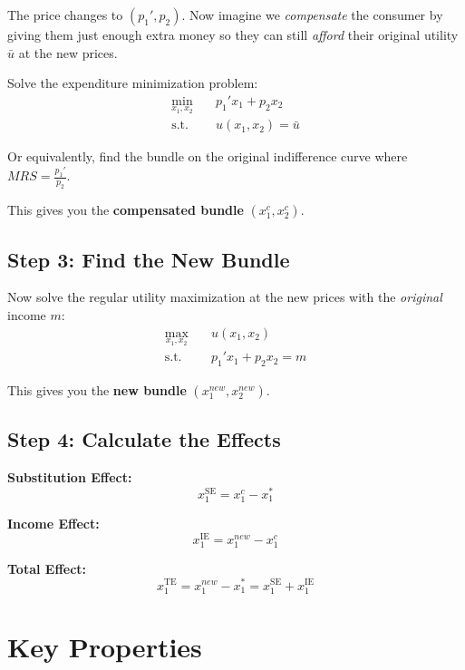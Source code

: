 \documentclass[12pt]{article}
\begin{document}
The price changes to $(p_1', p_2)$. Now imagine we \textit{compensate} the consumer by giving them just enough extra money so they can still \textit{afford} their original utility $\bar{u}$ at the new prices.

Solve the expenditure minimization problem:
\begin{align*}
\min_{x_1, x_2} \quad & p_1' x_1 + p_2 x_2 \\
\text{s.t.} \quad & u(x_1, x_2) = \bar{u}
\end{align*}

Or equivalently, find the bundle on the original indifference curve where $MRS = \frac{p_1'}{p_2}$.

This gives you the \textbf{compensated bundle} $(x_1^c, x_2^c)$.

\subsection*{Step 3: Find the New Bundle}

Now solve the regular utility maximization at the new prices with the \textit{original} income $m$:
\begin{align*}
\max_{x_1, x_2} \quad & u(x_1, x_2) \\
\text{s.t.} \quad & p_1' x_1 + p_2 x_2 = m
\end{align*}

This gives you the \textbf{new bundle} $(x_1^{new}, x_2^{new})$.

\subsection*{Step 4: Calculate the Effects}

\begin{tcolorbox}[colback=yellow!10!white,colframe=orange!75!black]
\textcolor{subcolor}{\textbf{Substitution Effect:}}
\[x_1^{\text{SE}} = x_1^c - x_1^*\]

\textcolor{incomecolor}{\textbf{Income Effect:}}
\[x_1^{\text{IE}} = x_1^{new} - x_1^c\]

\textcolor{totalcolor}{\textbf{Total Effect:}}
\[x_1^{\text{TE}} = x_1^{new} - x_1^* = x_1^{\text{SE}} + x_1^{\text{IE}}\]
\end{tcolorbox}

\section{Key Properties}
\end{document}
